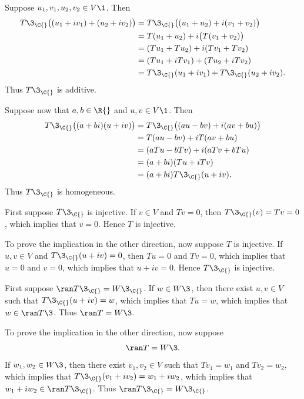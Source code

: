 \begin{Solution}
\begin{subtheorem}
\item
Suppose $u_1, v_1, u_2, v_2 \in V\1$. Then
\begin{align*}
T\3_{\C{}}\bigl( (u_1 + iv_1) + (u_2 + iv_2) \bigr) &= T\3_{\C{}}\bigl( (u_1 + u_2) + i(v_1 + v_2)\bigr) \\
&= T(u_1 + u_2) + i \bigl(T(v_1 + v_2) \bigr) \\
&= (Tu_1 + Tu_2) + i(Tv_1 + Tv_2) \\
&= (Tu_1+ iTv_1) + (Tu_2 + iTv_2) \\
&= T\3_{\C{}}(u_1 + iv_1)  + T\3_{\C{}}(u_2 + iv_2).
\end{align*}
Thus $T\3_{\C{}}$ is additive.

Suppose now that $a, b \in \R{}$ and $u, v \in V\1$. Then
\begin{align*}
T\3_{\C{}}\bigl( (a + bi)(u + iv) \bigr) &= T\3_{\C{}}\bigl( (au - bv) + i(av + bu) \bigr) \\
&= T(au -bv) + i T(av + bu) \\
&=( a Tu - bTv) + i (a Tv + b Tu) \\
&= (a + bi)(Tu + i Tv)\\
&= (a + bi)T\3_{\C{}}(u + iv).
\end{align*}
Thus $T\3_{\C{}}$ is homogeneous.

\item
First suppose $T\3_{\C{}}$ is injective. If $v \in V$ and $Tv = 0$, then $T\3_{\C{}}(v) = Tv = 0$, which implies that $v = 0$. Hence $T$ is injective.

To prove the implication in the other direction, now suppose $T$ is injective. If $u, v \in V$ and $T\3_{\C{}}(u+ iv) = 0$, then $Tu=0$ and $Tv=0$, which implies that $u=0$ and $v = 0$, which implies that $u+iv = 0$. Hence $T\3_{\C{}}$ is injective.

\item
First suppose $\ran T\3_{\C{}} = W\3_{\C{}}$. If $w \in W\3$, then there exist $u, v \in V$ such that $T\3_{\C{}}(u+ iv) = w$, which implies that $Tu = w$, which implies that $w \in \ran T\3$. Thus $\ran T = W\3$.

To prove the implication in the other direction, now suppose
\[
\ran T = W\3.
\]
If $w_1, w_2 \in W\3$, then there exist $v_1, v_2 \in V$ such that $Tv_1 = w_1$ and $Tv_2 = w_2$, which implies that $T\3_{\C{}}(v_1 + iv_2) = w_1 + iw_2$, which implies that $w_1 + iw_2 \in \ran T\3_{\C{}}$. Thus $\ran T\3_{\C{}} = W\3_{\C{}}$.
\end{subtheorem}
\end{Solution}

